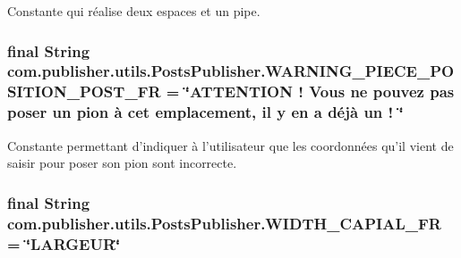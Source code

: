 Constante qui réalise deux espaces et un pipe. \hypertarget{interfacecom_1_1publisher_1_1utils_1_1PostsPublisher_a14280a3738e571750ffca034edabd4db}{
\subsubsection[{W\-A\-R\-N\-I\-N\-G\-\_\-\-P\-I\-E\-C\-E\-\_\-\-P\-O\-S\-I\-T\-I\-O\-N\-\_\-\-P\-O\-S\-T\-\_\-\-F\-R}]{\setlength{\rightskip}{0pt plus 5cm}final String com.\-publisher.\-utils.\-Posts\-Publisher.\-W\-A\-R\-N\-I\-N\-G\-\_\-\-P\-I\-E\-C\-E\-\_\-\-P\-O\-S\-I\-T\-I\-O\-N\-\_\-\-P\-O\-S\-T\-\_\-\-F\-R = \char`\"{}A\-T\-T\-E\-N\-T\-I\-O\-N ! Vous ne pouvez pas poser un pion à cet emplacement, il y en a déjà un ! \char`\"{}\hspace{0.3cm}{\ttfamily [static]}}}\label{interfacecom_1_1publisher_1_1utils_1_1PostsPublisher_a14280a3738e571750ffca034edabd4db}
Constante permettant d'indiquer à l'utilisateur que les coordonnées qu'il vient de saisir pour poser son pion sont incorrecte. \hypertarget{interfacecom_1_1publisher_1_1utils_1_1PostsPublisher_afffd7227ff17b003ba7a78e43fee9a3c}{
\subsubsection[{W\-I\-D\-T\-H\-\_\-\-C\-A\-P\-I\-A\-L\-\_\-\-F\-R}]{\setlength{\rightskip}{0pt plus 5cm}final String com.\-publisher.\-utils.\-Posts\-Publisher.\-W\-I\-D\-T\-H\-\_\-\-C\-A\-P\-I\-A\-L\-\_\-\-F\-R = \char`\"{}L\-A\-R\-G\-E\-U\-R\char`\"{}\hspace{0.3cm}{\ttfamily [static]}}}\label{interfacecom_1_1publisher_1_1utils_1_1PostsPublisher_afffd7227ff17b003ba7a78e43fee9a3c}

